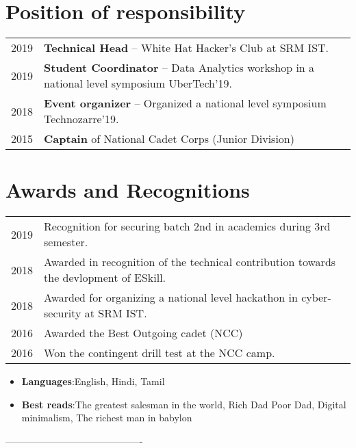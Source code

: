 \documentclass[letterpaper,11pt]{article}
\newcommand{\resumeSubHeadingListStart}{\begin{itemize}[leftmargin=*]}
\newcommand{\resumeSubHeadingListEnd}{\end{itemize}}
\begin{document}
\section{Position of responsibility}
\renewcommand{\arraystretch}{1.7}
 \begin{table}[ht!]
  \centering
    \begin{tabular}{p{5cm}p{12cm}}
	  2019 & \firabook\textbf{Technical Head} -- White Hat Hacker's Club at SRM IST. \\ 
	  2019 & \firabook\textbf{Student Coordinator} -- Data Analytics workshop in a national level symposium UberTech'19.  \\
	  2018 & \firabook\textbf{Event organizer} -- Organized a national level symposium Technozarre'19.  \\
	  2015 & \firabook\textbf{Captain} of National Cadet Corps (Junior Division) 
    \end{tabular}
\end{table}
  
\section{Awards and Recognitions}
\renewcommand{\arraystretch}{1.7}
\begin{table}[ht!]
	\centering
	\begin{tabular}{p{5cm}p{12cm}}
		2019 & \firabook Recognition for securing batch 2nd in academics during 3rd semester.\\
		2018 & \firabook Awarded in recognition of the technical contribution towards the devlopment of ESkill.\\ 
		2018 & \firabook Awarded for organizing a national level hackathon in cyber-security at SRM IST.  \\
		2016 & \firabook Awarded the Best Outgoing cadet (NCC)  \\
		2016 & \firabook Won the contingent drill test at the NCC camp.   \\
		 
	\end{tabular}
\end{table}
  \resumeSubHeadingListStart
\item{
	\textbf{Languages}{:\firabook English, Hindi, Tamil}
	
}
\resumeSubHeadingListEnd
  \resumeSubHeadingListStart
\item{
	\textbf{Best reads}{:\firabook The greatest salesman in the world, Rich Dad Poor Dad, Digital minimalism, The richest man in babylon}
	
}
\resumeSubHeadingListEnd
-------------------------------------------
\end{document}
